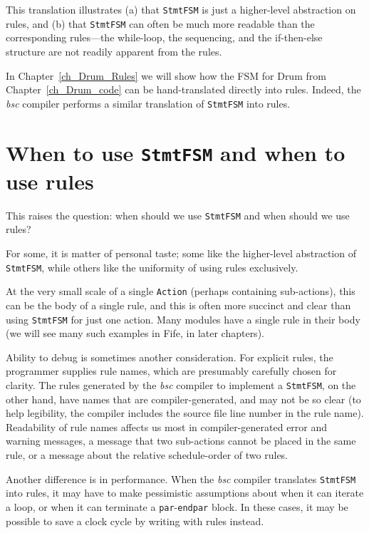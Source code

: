 This translation illustrates (a) that \verb|StmtFSM| is just a
higher-level abstraction on rules, and (b) that \verb|StmtFSM| can
often be much more readable than the corresponding rules---the
while-loop, the sequencing, and the if-then-else structure are not
readily apparent from the rules.

In Chapter~\ref{ch_Drum_Rules} we will show how the FSM for Drum from
Chapter~\ref{ch_Drum_code} can be hand-translated directly into rules.
Indeed, the \emph{bsc} compiler performs a similar translation of
\verb|StmtFSM| into rules.


\section{When to use {\tt StmtFSM} and when to use rules}

\label{Sec_StmtFSM_vs_rules}



This raises the question: when should we
use \verb|StmtFSM| and when should we use rules?

For some, it is matter of personal taste; some like the higher-level
abstraction of \verb|StmtFSM|, while others like the uniformity of
using rules exclusively.

At the very small scale of a single \verb|Action| (perhaps containing
sub-actions), this can be the body of a single rule, and this is often
more succinct and clear than using \verb|StmtFSM| for just one action.
Many modules have a single rule in their body (we will see many such
examples in Fife, in later chapters).

Ability to debug is sometimes another consideration. For explicit
rules, the programmer supplies rule names, which are presumably
carefully chosen for clarity.  The rules generated by the \emph{bsc}
compiler to implement a \verb|StmtFSM|, on the other hand, have names
that are compiler-generated, and may not be so clear (to help
legibility, the compiler includes the source file line number in the
rule name).  Readability of rule names affects us most in
compiler-generated error and warning messages, {\eg} a message that
two sub-actions cannot be placed in the same rule, or a message about
the relative schedule-order of two rules.

Another difference is in performance.  When the \emph{bsc} compiler
translates \verb|StmtFSM| into rules, it may have to make pessimistic
assumptions about when it can iterate a loop, or when it can terminate
a \verb|par|-\verb|endpar| block.  In these cases, it may be possible
to save a clock cycle by writing with rules instead.


